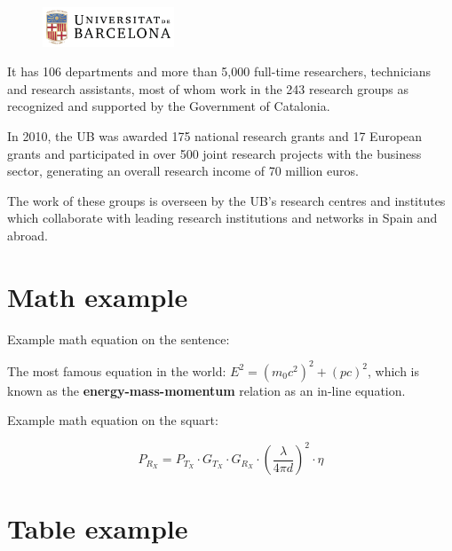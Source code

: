 \begin{figure}
    \centering
    \includegraphics[width=0.35\textwidth]{preambles/static/ub_logo/ub_logo_1.png}
\end{figure}
It has 106 departments and more than 5,000 full-time researchers, technicians and research assistants, most of whom work in the 243 research groups as recognized and supported by the Government of Catalonia. 

In 2010, the UB was awarded 175 national research grants and 17 European grants and participated in over 500 joint research projects with the business sector, generating an overall research income of 70 million euros. 

The work of these groups is overseen by the UB's research centres and institutes which collaborate with leading research institutions and networks in Spain and abroad. 

\let\clearpage\relax        %
\listoffigures

\newpage




\newpage



\section{Math example}

Example math equation on the sentence:

The most famous equation in the world: $E^2 = (m_0c^2)^2 + (pc)^2$, which is 
known as the \textbf{energy-mass-momentum} relation as an in-line equation.


Example math equation on the squart:

\begin{equation}
P_{R_X} = P_{T_X} \cdot G_{T_X}  \cdot G_{R_X} \cdot \left( \frac{\lambda}{4\pi d} \right)^2  \cdot \eta
\end{equation}

\section{Table example}

